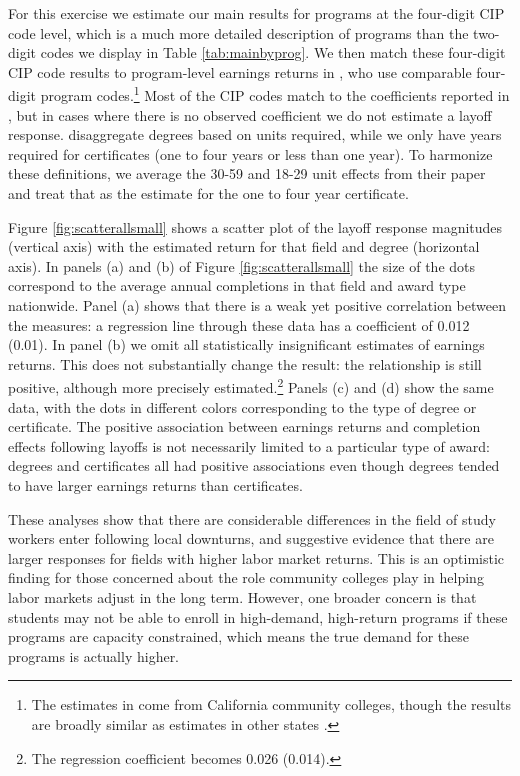 For this exercise we estimate our main results for programs at the four-digit CIP code level, which is a much more detailed description of programs than the two-digit codes we display in Table \ref{tab:mainbyprog}. We then match these four-digit CIP code results to program-level earnings returns in \citet{SKG2014}, who use comparable four-digit program codes.\footnote{The estimates in \citet{SKG2014} come from California community colleges, though the results are broadly similar as estimates in other states \citep{BB2017}.}  Most of the CIP codes match to the coefficients reported in \citet{SKG2014}, but in cases where there is no observed coefficient we do not estimate a layoff response. \citet{SKG2014} disaggregate degrees based on units required, while we only have years required for certificates (one to four years  or less than one year). To harmonize these definitions, we average the 30-59 and 18-29 unit effects from their paper and treat that as the estimate for the one to four year certificate. 

Figure \ref{fig:scatterallsmall} shows a scatter plot of the layoff response magnitudes (vertical axis) with the estimated return for that field and degree (horizontal axis). In panels (a) and (b) of Figure \ref{fig:scatterallsmall}  the size of the dots correspond to the average annual  completions in that field and award type nationwide. Panel (a) shows that there  is a weak yet  positive correlation between the measures: a regression line through these data has a coefficient of 0.012 (0.01). In panel (b) we omit all statistically insignificant estimates of earnings returns. This does not substantially change the result: the relationship is still positive, although more precisely estimated.\footnote{The regression coefficient becomes 0.026 (0.014).} Panels (c) and (d) show the same data, with the dots in different colors corresponding to the type of degree or certificate. The positive association between earnings returns and completion effects following layoffs is not necessarily limited to a particular type of award: degrees and certificates all had positive associations even though degrees tended to have larger earnings returns than certificates. 

These analyses show that there are considerable differences in the field of study workers enter following local downturns, and suggestive evidence that there are larger responses for fields with higher labor market returns. This is an optimistic finding for those concerned about the role community colleges play in helping labor markets adjust in the long term. However, one broader concern is that students may not be able to enroll in high-demand, high-return programs if these programs are capacity constrained, which means the true demand for these programs is actually higher.



